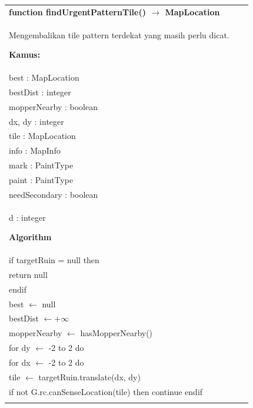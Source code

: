 \documentclass{article}
\newenvironment{pseudobox}
{
\centering
\begin{longtable}{|p{0.94\linewidth}|}
\hline
}
{
\\ \hline
\end{longtable}
\vspace{0.05cm}
}
\begin{document}
\begin{pseudobox}
\textbf{function findUrgentPatternTile() $\rightarrow$ MapLocation} \\
{ Mengembalikan tile pattern terdekat yang masih perlu dicat. }

\textbf{Kamus:} \\
\hspace*{1em} best : MapLocation \\
\hspace*{1em} bestDist : integer \\
\hspace*{1em} mopperNearby : boolean \\
\hspace*{1em} dx, dy : integer \\
\hspace*{1em} tile : MapLocation \\
\hspace*{1em} info : MapInfo \\
\hspace*{1em} mark : PaintType \\
\hspace*{1em} paint : PaintType \\
\hspace*{1em} needSecondary : boolean \\
\hspace*{1em} d : integer

\textbf{Algorithm} \\
\hspace*{1em} if targetRuin = null then \\
\hspace*{2em} return null \\
\hspace*{1em} endif \\

\hspace*{1em} best $\leftarrow$ null \\
\hspace*{1em} bestDist $\leftarrow +\infty$ \\
\hspace*{1em} mopperNearby $\leftarrow$ hasMopperNearby() \\

\hspace*{1em} for dy $\leftarrow$ -2 to 2 do \\
\hspace*{2em} for dx $\leftarrow$ -2 to 2 do \\
\hspace*{3em} tile $\leftarrow$ targetRuin.translate(dx, dy) \\
\hspace*{3em} if not G.rc.canSenseLocation(tile) then continue endif \\


\end{pseudobox}
\end{document}
